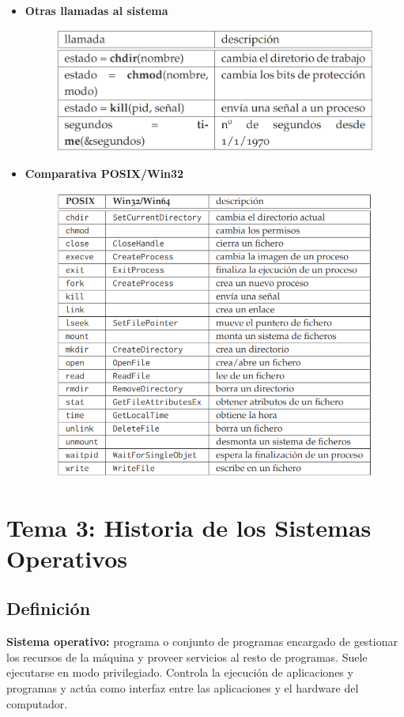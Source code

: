 \documentclass{article}
\begin{document}
\begin{itemize}
\item \textbf{Otras llamadas al sistema}
\begin{figure}[h]
\centering
\includegraphics[scale=1, width=110mm]{llamadas_4.png}
\end{figure}

\item \textbf{Comparativa POSIX/Win32}
\begin{figure}[h]
\centering
\includegraphics[scale=1, width=110mm]{comparativa.png}
\end{figure}

\end{itemize}

\section{Tema 3: Historia de los Sistemas Operativos}
\subsection{Definición}
\textbf{Sistema operativo:} programa o conjunto de programas encargado de gestionar los recursos de la máquina y proveer servicios al resto de programas. Suele ejecutarse en modo privilegiado. Controla la ejecución de aplicaciones y programas y actúa como interfaz entre las aplicaciones y el hardware del computador. 
\end{document}
